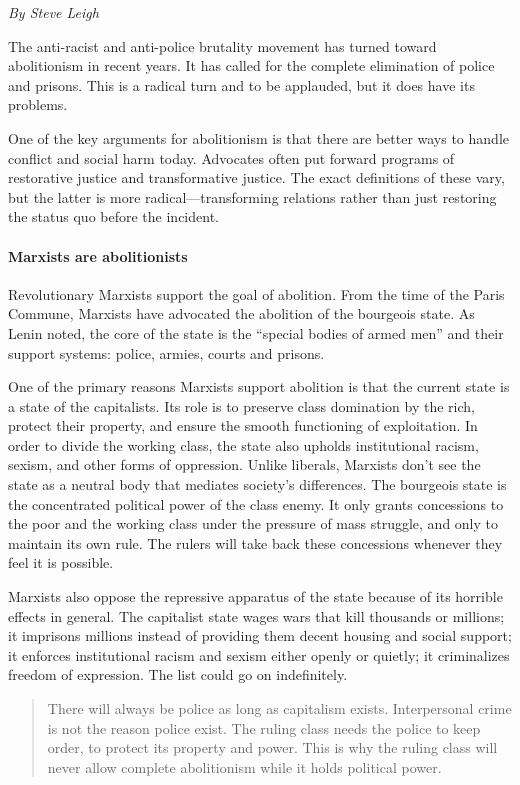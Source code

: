 \emph{By Steve Leigh}

The anti-racist and anti-police brutality movement has turned toward abolitionism in recent years. It has called for the complete elimination of police and prisons. This is a radical turn and to be applauded, but it does have its problems.

One of the key arguments for abolitionism is that there are better ways to handle conflict and social harm today. Advocates often put forward programs of restorative justice and transformative justice. The exact definitions of these vary, but the latter is more radical---transforming relations rather than just restoring the status quo before the incident.

\paragraph{Marxists are abolitionists}

Revolutionary Marxists support the goal of abolition. From the time of the Paris Commune, Marxists have advocated the abolition of the bourgeois state. As Lenin noted, the core of the state is the ``special bodies of armed men'' and their support systems: police, armies, courts and prisons.

One of the primary reasons Marxists support abolition is that the current state is a state of the capitalists. Its role is to preserve class domination by the rich, protect their property, and ensure the smooth functioning of exploitation. In order to divide the working class, the state also upholds institutional racism, sexism, and other forms of oppression. Unlike liberals, Marxists don't see the state as a neutral body that mediates society's differences. The bourgeois state is the concentrated political power of the class enemy. It only grants concessions to the poor and the working class under the pressure of mass struggle, and only to maintain its own rule. The rulers will take back these concessions whenever they feel it is possible.

Marxists also oppose the repressive apparatus of the state because of its horrible effects in general. The capitalist state wages wars that kill thousands or millions; it imprisons millions instead of providing them decent housing and social support; it enforces institutional racism and sexism either openly or quietly; it criminalizes freedom of expression. The list could go on indefinitely.

\blockquote{There will always be police as long as capitalism exists. Interpersonal crime is not the reason police exist. The ruling class needs the police to keep order, to protect its property and power. This is why the ruling class will never allow complete abolitionism while it holds political power.}

